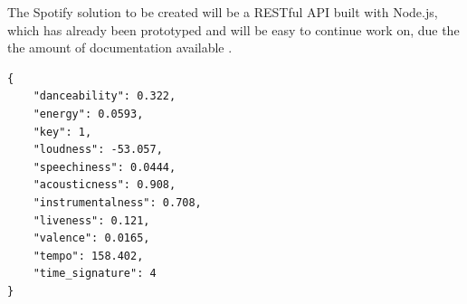 The Spotify solution to be created will be a RESTful API built with Node.js, which has already been prototyped and will be easy to continue work on, due the the amount of documentation available \cite{spotifyHello}.

\begin{lstlisting}[style=leftCode, caption={Some of the attributes of a song obtained through requesting information through the Spotify API},captionpos=b, label={spotifyJSON}]
{
    "danceability": 0.322,
    "energy": 0.0593,
    "key": 1,
    "loudness": -53.057,
    "speechiness": 0.0444,
    "acousticness": 0.908,
    "instrumentalness": 0.708,
    "liveness": 0.121,
    "valence": 0.0165,
    "tempo": 158.402,
    "time_signature": 4
}
\end{lstlisting}